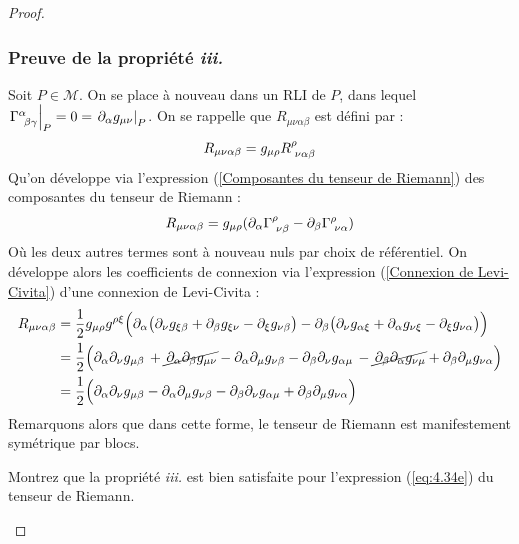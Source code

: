\begin{proof}
    \subsubsection{Preuve de la propriété \emph{iii.}}
        Soit $P\in \mathcal{M}$. On se place à nouveau dans un RLI de $P$, dans lequel $\atP{\Gamma\indices{^{\alpha}_{\!\beta \gamma}}} = 0 = \atP{\partial_{\alpha}g_{\mu \nu}}$.
        On se rappelle que $R_{\mu\nu \alpha \beta}$ est défini par :
        \begin{equation}
            R_{\mu\nu\alpha\beta} = g_{\mu \rho} R\indices{^\rho_{\!\nu\alpha\beta}}
        \end{equation}
        Qu'on développe via l'expression (\ref{Composantes du tenseur de Riemann}) des composantes du tenseur de Riemann :
        \begin{align}
            R_{\mu\nu\alpha\beta} = g_{\mu \rho}(\partial_{\alpha}\Gamma\indices{^{\rho}_{\!\nu \beta}} - \partial_{\beta}\Gamma\indices{^{\rho}_{\!\nu \alpha}})
        \end{align}
        Où les deux autres termes sont à nouveau nuls par choix de référentiel. On développe alors les coefficients de connexion via l'expression (\ref{Connexion de Levi-Civita}) d'une connexion de Levi-Civita :
        \begin{align}
            \nonumber
            R_{\mu\nu\alpha\beta} &= \frac{1}{2}g_{\mu \rho} g^{\rho \xi} \Bigl( \partial_{\alpha}\bigl(\partial_{\nu}g_{\xi \beta} + \partial_{\beta}g_{\xi \nu} - \partial_{\xi}g_{\nu \beta}\bigr) - \partial_{\beta}\bigl(\partial_{\nu}g_{\alpha \xi} + \partial_{\alpha}g_{\nu \xi} - \partial_{\xi}g_{\nu \alpha}\bigr) \Bigr)\\
            &= \frac{1}{2}\Bigl(\partial_{\alpha}\partial_{\nu}g_{\mu \beta} \,+\cancel{\, \partial_{\alpha}\partial_{\beta}g_{\mu \nu}} - \partial_{\alpha}\partial_{\mu}g_{\nu \beta} - \partial_{\beta}\partial_{\nu}g_{\alpha \mu} \,-\cancel{\, \partial_{\beta}\partial_{\alpha}g_{\nu \mu}} + \partial_{\beta}\partial_{\mu}g_{\nu \alpha}\Bigr)\\
            \label{eq:4.34e}
            &= \frac{1}{2}\Bigl(\partial_{\alpha}\partial_{\nu}g_{\mu \beta} - \partial_{\alpha}\partial_{\mu}g_{\nu \beta} - \partial_{\beta}\partial_{\nu}g_{\alpha \mu} + \partial_{\beta}\partial_{\mu}g_{\nu \alpha} \Bigr)
        \end{align}
        Remarquons alors que dans cette forme, le tenseur de Riemann est manifestement symétrique par blocs.
        \begin{exerc}
            Montrez que la propriété \emph{iii.} est bien satisfaite pour l'expression (\ref{eq:4.34e}) du tenseur de Riemann.
        \end{exerc}

\end{proof}
